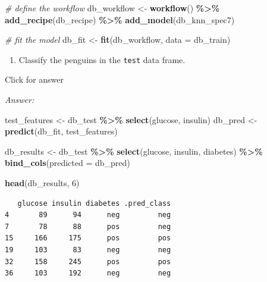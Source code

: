 \documentclass[
]{book}
\newenvironment{Shaded}{\begin{snugshade}}{\end{snugshade}}
\newcommand{\AttributeTok}[1]{\textcolor[rgb]{0.13,0.29,0.53}{#1}}
\newcommand{\CommentTok}[1]{\textcolor[rgb]{0.56,0.35,0.01}{\textit{#1}}}
\newcommand{\DecValTok}[1]{\textcolor[rgb]{0.00,0.00,0.81}{#1}}
\newcommand{\FunctionTok}[1]{\textcolor[rgb]{0.13,0.29,0.53}{\textbf{#1}}}
\newcommand{\NormalTok}[1]{#1}
\newcommand{\OtherTok}[1]{\textcolor[rgb]{0.56,0.35,0.01}{#1}}
\newcommand{\SpecialCharTok}[1]{\textcolor[rgb]{0.81,0.36,0.00}{\textbf{#1}}}
\providecommand{\tightlist}{%
  \setlength{\itemsep}{0pt}\setlength{\parskip}{0pt}}
\begin{document}
\begin{Shaded}
\begin{Highlighting}[]
\CommentTok{\# define the workflow}
\NormalTok{db\_workflow }\OtherTok{\textless{}{-}} \FunctionTok{workflow}\NormalTok{() }\SpecialCharTok{\%\textgreater{}\%} 
  \FunctionTok{add\_recipe}\NormalTok{(db\_recipe) }\SpecialCharTok{\%\textgreater{}\%}
  \FunctionTok{add\_model}\NormalTok{(db\_knn\_spec7)}
\end{Highlighting}
\end{Shaded}

\begin{Shaded}
\begin{Highlighting}[]
\CommentTok{\# fit the model}
\NormalTok{db\_fit }\OtherTok{\textless{}{-}} \FunctionTok{fit}\NormalTok{(db\_workflow, }\AttributeTok{data =}\NormalTok{ db\_train)}
\end{Highlighting}
\end{Shaded}

\begin{enumerate}
\def\labelenumi{\alph{enumi}.}
\setcounter{enumi}{2}
\tightlist
\item
  Classify the penguins in the \texttt{test} data frame.
\end{enumerate}

Click for answer

\emph{Answer:}

\begin{Shaded}
\begin{Highlighting}[]
\NormalTok{test\_features }\OtherTok{\textless{}{-}}\NormalTok{ db\_test }\SpecialCharTok{\%\textgreater{}\%} \FunctionTok{select}\NormalTok{(glucose, insulin) }
\NormalTok{db\_pred }\OtherTok{\textless{}{-}} \FunctionTok{predict}\NormalTok{(db\_fit, test\_features)}

\NormalTok{db\_results }\OtherTok{\textless{}{-}}\NormalTok{ db\_test }\SpecialCharTok{\%\textgreater{}\%} 
  \FunctionTok{select}\NormalTok{(glucose, insulin, diabetes) }\SpecialCharTok{\%\textgreater{}\%} 
  \FunctionTok{bind\_cols}\NormalTok{(}\AttributeTok{predicted =}\NormalTok{ db\_pred)}

\FunctionTok{head}\NormalTok{(db\_results, }\DecValTok{6}\NormalTok{)}
\end{Highlighting}
\end{Shaded}

\begin{verbatim}
   glucose insulin diabetes .pred_class
4       89      94      neg         neg
7       78      88      pos         neg
15     166     175      pos         pos
19     103      83      neg         neg
32     158     245      pos         pos
36     103     192      neg         neg
\end{verbatim}
\end{document}

